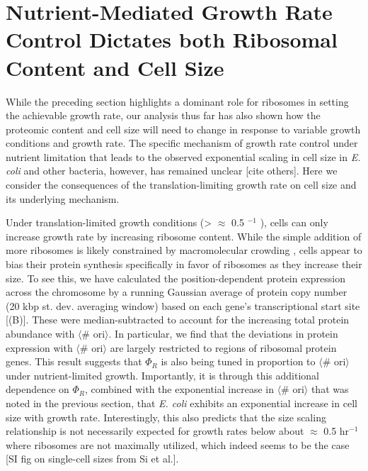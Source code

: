 \section{Nutrient-Mediated Growth Rate Control Dictates both Ribosomal Content and Cell Size}
\label{sec:minimal_model}
While the preceding section highlights a dominant role for ribosomes in setting
the achievable growth rate, our analysis thus far has also shown how the
proteomic content and cell size will need to change in response to variable
growth conditions and growth rate. The specific mechanism of growth rate control
under nutrient limitation that leads to the observed exponential scaling in cell
size in \textit{E. coli} and other bacteria, however, has remained unclear
\citep{si2017}  [cite others]. Here we consider the consequences of the
translation-limiting growth rate on cell size and its underlying mechanism.


%

%
%

Under translation-limited growth conditions (> $\approx$ 0.5 $^{-1}$ ), cells can
only increase growth rate by increasing ribosome content. While the simple
addition of more ribosomes is likely constrained by macromolecular crowding
\citep{delarue2018, solerbistue2020}, cells appear to bias their protein
synthesis specifically in favor of ribosomes as they increase their size. To see
this, we have calculated the position-dependent protein expression across the
chromosome by a running Gaussian average of protein copy number (20 kbp st. dev.
averaging window) based on each gene's transcriptional start site
[(B)]. These were median-subtracted to account  for
the increasing total protein abundance with $\langle$\# ori$\rangle$. In
particular, we find that the deviations in protein expression with $\langle$\#
ori$\rangle$ are largely restricted to regions of ribosomal protein genes. This
result suggests that $\Phi_R$ is also being tuned in proportion to $\langle$\#
ori$\rangle$ under nutrient-limited growth. Importantly, it is through this
additional dependence on $\Phi_R$, combined with the exponential increase in
$\langle$\# ori$\rangle$ that was noted in the previous section, that \textit{E.
coli} exhibits an exponential increase in cell size with growth rate.
Interestingly, this also predicts that the size scaling relationship is not
necessarily expected for growth rates below about $\approx$ 0.5 hr$^{-1}$  where
ribosomes are not maximally utilized, which indeed seems to be the case [SI fig
on single-cell sizes from Si et al.].

